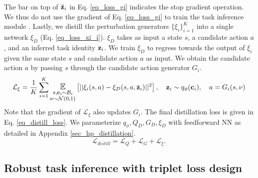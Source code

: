 The bar on top of $\bar{\bf z}_i$ in Eq. \ref{eq_loss_gi} indicates the stop gradient operation. We thus do not use the gradient of Eq. \ref{eq_loss_gi} to train the task inference module \cite{rakelly2019efficient}. Lastly, we distill the perturbation generators $\{\xi_i\}^K_{i=1}$ into a single network $\xi_D$ (Eq. \ref{eq_loss_xi_i}).
$\xi_D$ takes as input a state $s$, a candidate action $a$, and an inferred task identity ${\bf z}_i$. We train $\xi_D$ to regress towards the output of $\xi_i$ given the same state $s$ and candidate action $a$ as input.
We obtain the candidate action $a$ by passing $s$ through the candidate action generator $G_i$.
\begin{equation}\label{eq_loss_xi_i}
    \mathcal{L}_\xi = \frac{1}{K} \sum_{i=1}^{K} \mathlarger{\underset{\substack{s, {\bf c}_{i} \sim \mathcal{B}_i \\ \nu \sim \mathcal{N}(0,1)} }{\mathbb{E}}}\left[ || \xi_i(s, a) - \xi_D(s, a, \bar{\bf z}_i) || ^ 2 \right], \quad {\bf z}_i \sim q_\phi({\bf c}_{i}), \quad a = G_i(s, \nu)
\end{equation}
Note that the gradient of $\mathcal{L}_\xi$ also updates $G_i$. The final distillation loss is given in Eq. \ref{eq_distill_loss}. We parameterize $q_\phi, Q_D, G_D, \xi_D$ with feedforward NN as detailed in Appendix \ref{sec_hp_distillation}.
\begin{equation}\label{eq_distill_loss}
    \mathcal{L}_{distill} = \mathcal{L}_Q + \mathcal{L}_G + \mathcal{L}_\xi.
\end{equation}

\subsection{Robust task inference with triplet loss design}\label{sec_algo_triplet}



